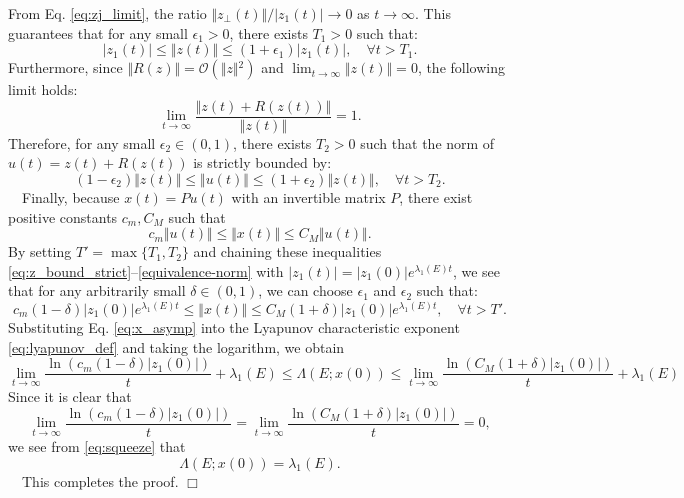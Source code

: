 \documentclass[11pt,a4paper]{article}
\begin{document}
From Eq. \eqref{eq:zj_limit}, the ratio $\Vert{}z_{\perp}(t)\Vert{}/\vert{}z_1(t)\vert{} \to 0$ as $t \to \infty$. This guarantees that for any small $\epsilon_1 > 0$, there exists $T_1 > 0$ such that:
\begin{equation}
\vert{}z_1(t)\vert{} \le \Vert{}z(t)\Vert{} \le (1 + \epsilon_1)\vert{}z_1(t)\vert{}, \quad \forall t > T_1. \label{eq:z_bound_strict}
\end{equation}
Furthermore, since $\Vert{}R(z)\Vert{} = \mathcal{O}(\Vert{}z\Vert{}^2)$ and $\lim_{t \to \infty} \Vert{}z(t)\Vert{} = 0$, the following limit holds:
\begin{equation}
\lim_{t \to \infty} \frac{\Vert{}z(t) + R(z(t))\Vert{}}{\Vert{}z(t)\Vert{}} = 1. \label{eq:u_z_limit}
\end{equation}
Therefore, for any small $\epsilon_2 \in (0, 1)$, there exists $T_2 > 0$ such that the norm of $u(t) = z(t) + R(z(t))$ is strictly bounded by:
\begin{equation}
(1 - \epsilon_2)\Vert{}z(t)\Vert{} \le \Vert{}u(t)\Vert{} \le (1 + \epsilon_2)\Vert{}z(t)\Vert{}, \quad \forall t > T_2. \label{eq:u_bound_strict}
\end{equation}
~~Finally, because $x(t) = P u(t)$ with an invertible matrix $P$, there exist positive constants $c_m, C_M$ such that 
\begin{equation}
c_m \Vert{}u(t)\Vert{} \le \Vert{}x(t)\Vert{} \le C_M \Vert{}u(t)\Vert{}. \label{equivalence-norm}
\end{equation}
By setting $T' = \max\{T_1, T_2\}$ and chaining these inequalities \eqref{eq:z_bound_strict}--\eqref{equivalence-norm} with $\vert{}z_1(t)\vert{} = \vert{}z_1(0)\vert{}e^{\lambda_1(E)t}$, we see that for any arbitrarily small $\delta \in (0, 1)$, we can choose $\epsilon_1$ and $\epsilon_2$ such that:
\begin{equation}
c_m (1 - \delta) |z_1(0)| e^{\lambda_1(E) t} \le \Vert{}x(t)\Vert{} \le C_M (1 + \delta) |z_1(0)| e^{\lambda_1(E) t},\quad \forall t > T'. \label{eq:x_asymp}
\end{equation}
Substituting Eq. \eqref{eq:x_asymp} into the Lyapunov characteristic exponent \eqref{eq:lyapunov_def} and taking the  logarithm, we obtain
\begin{equation}
\lim_{t \to \infty} \frac{\ln \left( c_m (1 - \delta) |z_1(0)| \right)}{t} + \lambda_1(E) \le \Lambda(E; x(0)) \le \lim_{t \to \infty} \frac{\ln \left( C_M (1 + \delta) |z_1(0)| \right)}{t} + \lambda_1(E) \label{eq:squeeze}
\end{equation}
Since it is clear that
\begin{equation}
\lim_{t \to \infty} \frac{\ln \left( c_m (1 - \delta) |z_1(0)| \right)}{t} =\lim_{t \to \infty} \frac{\ln \left( C_M (1 + \delta) |z_1(0)| \right)}{t}=0,
\end{equation}
we see from \eqref{eq:squeeze} that
\begin{equation}
\Lambda(E;x(0)) = \lambda_1(E). \label{eq:lyapunov_final}
\end{equation}
~~This completes the proof. \hfill $\Box$
\end{document}
